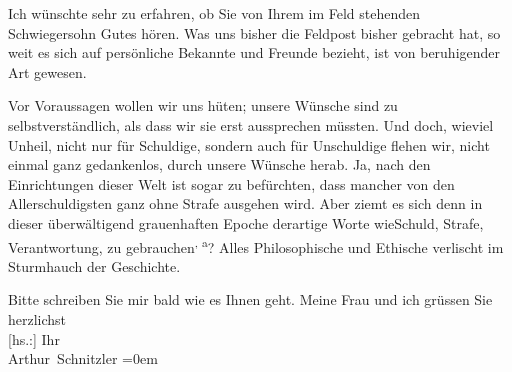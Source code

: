 \pstart
           Ich wünschte sehr zu erfahren, ob {\pb}Sie von Ihrem
               im Feld stehenden Schwiegersohn Gutes hören. Was uns bisher die Feldpost bisher
               gebracht hat, so weit es sich auf persönliche Bekannte und Freunde bezieht, ist von
               beruhigender Art gewesen.\pend
           
\pstart
           Vor Voraussagen wollen wir uns hüten; unsere Wünsche sind zu selbstverständlich, als
               dass wir sie erst aussprechen müssten. Und doch, wieviel Unheil, nicht nur für
               Schuldige, sondern auch für Unschuldige flehen wir, nicht einmal ganz gedankenlos,
               durch unsere Wünsche herab. Ja, nach den Einrichtungen dieser Welt ist sogar zu
               befürchten, dass mancher von den Allerschuldigsten ganz ohne Strafe ausgehen wird.
               Aber ziemt es sich \introOben{}denn\introOben{} in dieser überwältigend grauenhaften
               Epoche derartige Worte \introOben{}wie\introOben{}{ }Schuld, Strafe, Verantwortung, zu gebrauchen\substVorne{}\textsuperscript{, a}\substDazwischen{}? A\substHinten{}lles Philosophische und Ethische verlischt im Sturmhauch der Geschichte.\pend
           
\pstart
           Bitte schreiben Sie mir bald wie es Ihnen geht. Meine Frau und ich grüssen Sie herzlichst{\\[\baselineskip]}{[}hs.:{]} Ihr{\\[\baselineskip]}\spacefill\mbox{Arthur Schnitzler}\pend
           \leftskip=0em{}\endnumbering{}  
      